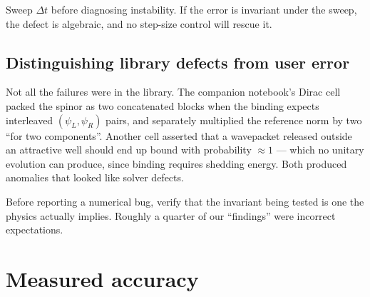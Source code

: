 \documentclass[11pt,a4paper]{article}
\theoremstyle{plain}
\theoremstyle{definition}
\begin{document}
\begin{lesson}
Sweep $\Delta t$ before diagnosing instability. If the error is invariant under
the sweep, the defect is algebraic, and no step-size control will rescue it.
\end{lesson}

\subsection{Distinguishing library defects from user error}

Not all the failures were in the library. The companion notebook's Dirac cell
packed the spinor as two concatenated blocks when the binding expects
interleaved $(\psi_L,\psi_R)$ pairs, and separately multiplied the reference
norm by two ``for two components''. Another cell asserted that a wavepacket
released outside an attractive well should end up bound with probability
$\approx1$ --- which no unitary evolution can produce, since binding requires
shedding energy. Both produced anomalies that looked like solver defects.

\begin{lesson}
Before reporting a numerical bug, verify that the invariant being tested is one
the physics actually implies. Roughly a quarter of our ``findings'' were
incorrect expectations.
\end{lesson}

\section{Measured accuracy}\label{sec:accuracy}
\end{document}
